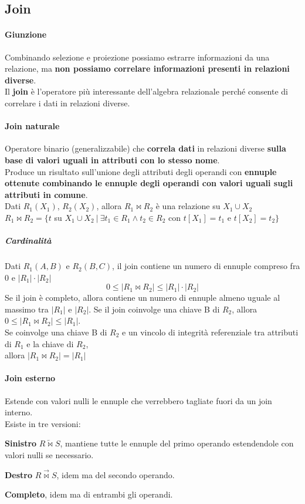 \documentclass[10pt]{book}
\begin{document}
\subsection{Join}
\paragraph{Giunzione} Combinando selezione e proiezione possiamo estrarre informazioni da una relazione, ma \textbf{non possiamo correlare informazioni presenti in relazioni diverse}.\\
Il \textbf{join} è l'operatore più interessante dell'algebra relazionale perché consente di correlare i dati in relazioni diverse.
\paragraph{Join naturale} Operatore binario (generalizzabile) che \textbf{correla dati} in relazioni diverse \textbf{sulla base di valori uguali in attributi con lo stesso nome}.\\
Produce un risultato sull'unione degli attributi degli operandi con \textbf{ennuple ottenute combinando le ennuple degli operandi con valori uguali sugli attributi in comune}.\\
Dati $R_1(X_1)$, $R_2(X_2)$, allora $R_1\bowtie R_2$ è una relazione su $X_1\cup X_2$\\
$R_1\bowtie R_2 = \{t$ su $X_1\cup X_2\:|\:\exists t_1\in R_1 \wedge t_2\in R_2$ con $t[X_1] = t_1$ e $t[X_2] = t_2\}$
\subparagraph{Cardinalità} Dati $R_1(A,B)$ e $R_2(B,C)$, il join contiene un numero di ennuple compreso fra 0 e $|R_1|\cdot|R_2|$
$$0 \leq |R_1 \bowtie R_2|\leq |R_1|\cdot|R_2|$$
Se il join è completo, allora contiene un numero di ennuple almeno uguale al massimo tra $|R_1|$ e $|R_2|$. Se il join coinvolge una chiave B di $R_2$, allora $0 \leq |R_1 \bowtie R_2|\leq |R_1|$.\\
Se coinvolge una chiave B di $R_2$ e un vincolo di integrità referenziale tra attributi di $R_1$ e la chiave di $R_2$,\\allora $|R_1 \bowtie R_2| = |R_1|$
\paragraph{Join esterno} Estende con valori nulli le ennuple che verrebbero tagliate fuori da un join interno.\\
Esiste in tre versioni:
\begin{list}{}{}
	\item \textbf{Sinistro} $R \overleftarrow{\bowtie} S$, mantiene tutte le ennuple del primo operando estendendole con valori nulli se necessario.
	\item \textbf{Destro} $R \overrightarrow{\bowtie} S$, idem ma del secondo operando.
	\item \textbf{Completo}, idem ma di entrambi gli operandi.
\end{list}
\end{document}
